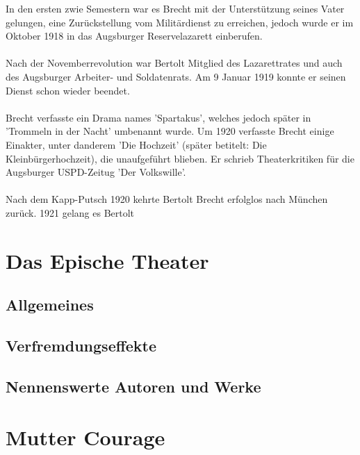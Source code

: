 \documentclass[a4paper]{article}
\begin{document}
	In den ersten zwie Semestern war es Brecht mit der Unterstützung seines Vater gelungen, eine Zurückstellung vom Militärdienst zu erreichen, jedoch wurde er im Oktober 1918 in das Augsburger Reservelazarett einberufen.\\\\
        Nach der Novemberrevolution war Bertolt Mitglied des Lazarettrates und auch des Augsburger Arbeiter- und Soldatenrats. Am 9 Januar 1919 konnte er seinen Dienst schon wieder beendet.\\\\
        Brecht verfasste ein Drama names 'Spartakus', welches jedoch später in 'Trommeln in der Nacht' umbenannt wurde. Um 1920 verfasste Brecht einige Einakter, unter danderem 'Die Hochzeit' (später betitelt: Die Kleinbürgerhochzeit), die unaufgeführt blieben. Er schrieb Theaterkritiken für die Augsburger USPD-Zeitug 'Der Volkswille'.\\\\
        Nach dem Kapp-Putsch 1920 kehrte Bertolt Brecht erfolglos nach München zurück. 1921 gelang es Bertolt 
        
        \section{Das Epische Theater}

		\subsection{Allgemeines}
                
        	\subsection{Verfremdungseffekte}

		\subsection{Nennenswerte Autoren und Werke}
        
        \section{Mutter Courage}
\end{document}
